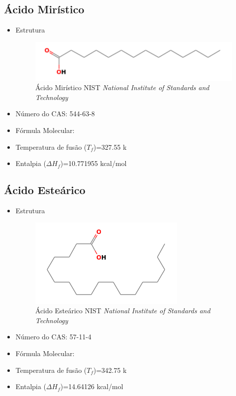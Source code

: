 	\subsection{Ácido Mirístico}
	\label{sec:1}
	\begin{itemize}
		\item Estrutura
		\begin{figure}[H]
			\centering
			\includegraphics[width=0.7\linewidth]{dados/figuras/Ac_miristico.png}
			\caption[Ácido Mirístico]{Ácido Mirístico  NIST \textit{National Institute of Standards and Technology}}
			\label{fig:nist1}
		\end{figure}
		\item Número do CAS: 544-63-8
		\item Fórmula Molecular: 
		\item Temperatura de fusão ($T_f$)=327.55 k
		\item Entalpia ($\Delta H_{f}$)=10.771955 kcal/mol
	\end{itemize}
	
	\subsection{Ácido Esteárico}
	\label{sec:2}
	\begin{itemize}
		\item Estrutura
		\begin{figure}[H]
			\centering
			\includegraphics[width=0.7\linewidth]{dados/figuras/Ac_estearico.png}
			\caption[Ácido Esteárico]{Ácido Esteárico NIST \textit{National Institute of Standards and Technology}}
			\label{fig:nist2}
		\end{figure}
		\item Número do CAS: 57-11-4
		\item Fórmula Molecular: 
		\item Temperatura de fusão ($T_f$)=342.75 k
		\item Entalpia ($\Delta H_{f}$)=14.64126 kcal/mol
	\end{itemize}
	
